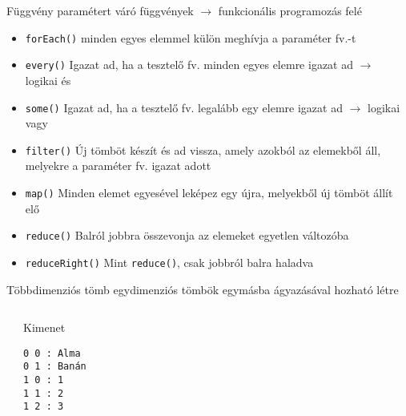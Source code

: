 \begin{frame}
  Függvény paramétert váró függvények $\to$ funkcionális programozás felé
  \begin{itemize}
    \item \texttt{forEach()} minden egyes elemmel külön meghívja a paraméter fv.-t
    \item \texttt{every()} Igazat ad, ha a tesztelő fv. minden egyes elemre igazat ad $\to$ logikai és
    \item \texttt{some()} Igazat ad, ha a tesztelő fv. legalább egy elemre igazat ad $\to$ logikai vagy
    \item \texttt{filter()} Új tömböt készít és ad vissza, amely azokból az elemekből áll, melyekre a paraméter fv. igazat adott
    \item \texttt{map()} Minden elemet egyesével leképez egy újra, melyekből új tömböt állít elő
    \item \texttt{reduce()} Balról jobbra összevonja az elemeket egyetlen változóba
    \item \texttt{reduceRight()} Mint \texttt{reduce()}, csak jobbról balra haladva
  \end{itemize}
\end{frame}

\begin{frame}
  \footnotesize
  \begin{exampleblock}{}
    \vspace{-0.3cm}
    
    \vspace{-0.3cm}
  \end{exampleblock}
\end{frame}

\begin{frame}[fragile]
  Többdimenziós tömb egydimenziós tömbök egymásba ágyazásával hozható létre
  \vfill
  \footnotesize
  \begin{columns}[T]
      \begin{exampleblock}{}
        
      \end{exampleblock}
      \begin{block}{Kimenet}
        \begin{verbatim}
0 0 : Alma
0 1 : Banán
1 0 : 1
1 1 : 2
1 2 : 3
\end{verbatim}
      \end{block}
  \end{columns}
\end{frame}

